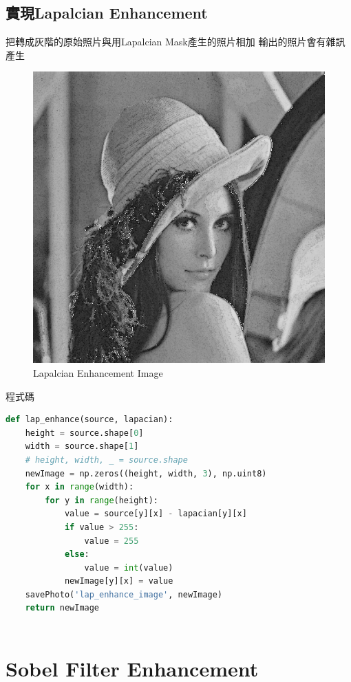 \documentclass[12pt,a4paper]{article}
\begin{document}
\subsection{實現Lapalcian Enhancement}
{
把轉成灰階的原始照片與用Lapalcian Mask產生的照片相加
輸出的照片會有雜訊產生
\begin{figure}[ht]
\centering
\includegraphics[width=.4\textwidth]{image/lap_enhance_image.png}
\caption{Lapalcian Enhancement Image}%
\label{要合併的兩張圖}%
\end{figure}


程式碼
\begin{lstlisting}[language=Python]
def lap_enhance(source, lapacian):
    height = source.shape[0]
    width = source.shape[1]
    # height, width, _ = source.shape
    newImage = np.zeros((height, width, 3), np.uint8)
    for x in range(width):
        for y in range(height):
            value = source[y][x] - lapacian[y][x]
            if value > 255:
                value = 255
            else:
                value = int(value)
            newImage[y][x] = value
    savePhoto('lap_enhance_image', newImage)
    return newImage
    
\end{lstlisting}
}

\newpage
\section{Sobel Filter Enhancement}
\end{document}
